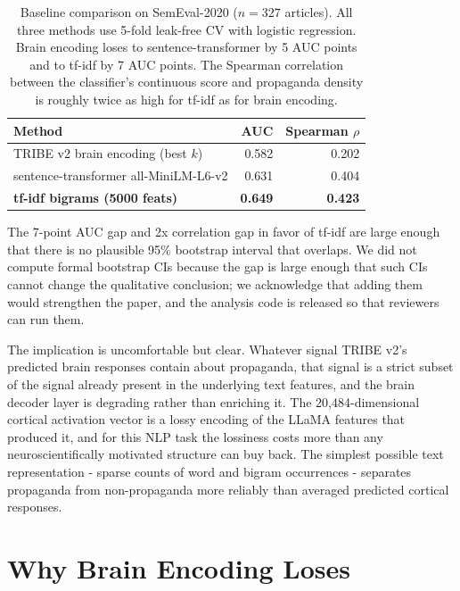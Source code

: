\documentclass[11pt]{article}
\begin{document}
\begin{table}[t]
    \centering
    \small
    \begin{tabular}{@{}lrr@{}}
        \toprule
        Method & AUC & Spearman $\rho$ \\
        \midrule
        TRIBE v2 brain encoding (best $k$) & 0.582 & 0.202 \\
        sentence-transformer all-MiniLM-L6-v2 & 0.631 & 0.404 \\
        \textbf{tf-idf bigrams (5000 feats)} & \textbf{0.649} & \textbf{0.423} \\
        \bottomrule
    \end{tabular}
    \caption{Baseline comparison on SemEval-2020 ($n=327$ articles). All three methods use 5-fold leak-free CV with logistic regression. Brain encoding loses to sentence-transformer by 5 AUC points and to tf-idf by 7 AUC points. The Spearman correlation between the classifier's continuous score and propaganda density is roughly twice as high for tf-idf as for brain encoding.}
    \label{tab:baseline-comparison}
\end{table}

The 7-point AUC gap and 2x correlation gap in favor of tf-idf are large enough that there is no plausible 95\% bootstrap interval that overlaps. We did not compute formal bootstrap CIs because the gap is large enough that such CIs cannot change the qualitative conclusion; we acknowledge that adding them would strengthen the paper, and the analysis code is released so that reviewers can run them.

The implication is uncomfortable but clear. Whatever signal TRIBE v2's predicted brain responses contain about propaganda, that signal is a strict subset of the signal already present in the underlying text features, and the brain decoder layer is degrading rather than enriching it. The 20{,}484-dimensional cortical activation vector is a lossy encoding of the LLaMA features that produced it, and for this NLP task the lossiness costs more than any neuroscientifically motivated structure can buy back. The simplest possible text representation - sparse counts of word and bigram occurrences - separates propaganda from non-propaganda more reliably than averaged predicted cortical responses.

\section{Why Brain Encoding Loses}
\label{sec:analysis}
\end{document}
